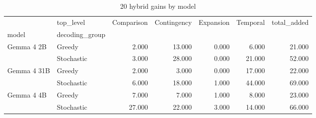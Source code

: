 \begin{table}
\caption{20 hybrid gains by model}
\begin{tabular}{llrrrrr}
\toprule
 & top_level & Comparison & Contingency & Expansion & Temporal & total\_added \\
model & decoding_group &  &  &  &  &  \\
\midrule
\multirow[t]{2}{*}{Gemma 4 2B} & Greedy & 2.000 & 13.000 & 0.000 & 6.000 & 21.000 \\
 & Stochastic & 3.000 & 28.000 & 0.000 & 21.000 & 52.000 \\
\cline{1-7}
\multirow[t]{2}{*}{Gemma 4 31B} & Greedy & 2.000 & 3.000 & 0.000 & 17.000 & 22.000 \\
 & Stochastic & 6.000 & 18.000 & 1.000 & 44.000 & 69.000 \\
\cline{1-7}
\multirow[t]{2}{*}{Gemma 4 4B} & Greedy & 7.000 & 7.000 & 1.000 & 8.000 & 23.000 \\
 & Stochastic & 27.000 & 22.000 & 3.000 & 14.000 & 66.000 \\
\cline{1-7}
\bottomrule
\end{tabular}
\end{table}
